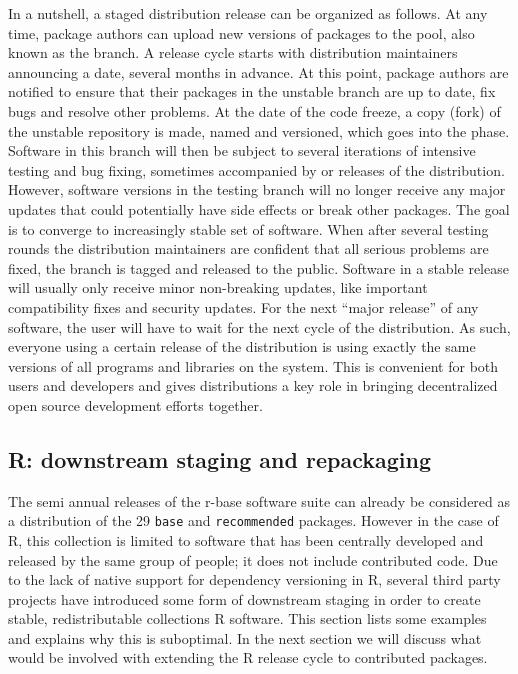 In a nutshell, a staged distribution release can be organized as follows. At any
time, package authors can upload new versions of packages to the 
pool, also known as the  branch. A release cycle starts with
distribution maintainers announcing a  date, several
months in advance. At this point, package authors are notified to ensure
that their packages in the unstable branch are up to date, fix bugs and resolve
other problems. At the date of the code freeze, a copy (fork) of the unstable
repository is made, named and versioned, which goes into the 
phase. Software in this branch will then be subject to several iterations of
intensive testing and bug fixing, sometimes accompanied by  or
 releases of the distribution. However, software versions in the testing branch will
no longer receive any major updates that could potentially have side effects
or break other packages. The goal is to converge to increasingly stable set of
software. When after several testing rounds the distribution maintainers are
confident that all serious problems are fixed, the branch is tagged 
and released to the public. Software in a stable release will usually only
receive minor non-breaking updates, like important compatibility fixes and
security updates. For the next ``major release'' of any software, the user will
have to wait for the next cycle of the distribution. As such, everyone using a
certain release of the distribution is using exactly the same versions of all programs
and libraries on the system. This is convenient for both users and developers
and gives distributions a key role in bringing decentralized open source
development efforts together.

\subsection{R: downstream staging and repackaging}

The semi annual releases of the r-base software suite can already be considered
as a distribution of the 29 \texttt{base} and \texttt{recommended} packages.
However in the case of R, this collection is limited to software that has been centrally
developed and released by the same group of people; it does not include contributed
code. Due to the lack of native support for dependency versioning in
R, several third party projects have introduced some form of downstream staging in order to
create stable, redistributable collections R software. This section lists some
examples and explains why this is suboptimal. In the next section we will
discuss what would be involved with extending the R release cycle to contributed
packages.

